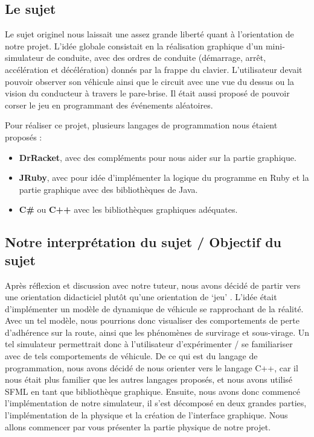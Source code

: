 \subsection{Le sujet}\label{subsec:le-sujet}
Le sujet originel nous laissait une assez grande liberté quant à l'orientation de notre projet.
L'idée globale consistait en la réalisation graphique d'un mini-simulateur de conduite, avec des ordres de conduite (démarrage, arrêt, accélération et décélération) donnés par la frappe du clavier.
L'utilisateur devait pouvoir observer son véhicule ainsi que le circuit avec une vue du dessus ou la vision du conducteur à travers le pare-brise.
Il était aussi proposé de pouvoir \og corser\fg{} le jeu en programmant des événements aléatoires.

Pour réaliser ce projet, plusieurs langages de programmation nous étaient proposés :
\begin{itemize}
    \item \textbf{DrRacket}, avec des compléments pour nous aider sur la partie graphique.
    \item \textbf{JRuby}, avec pour idée d'implémenter la logique du programme en Ruby et la partie graphique avec des bibliothèques de Java.
    \item \textbf{C\#} ou \textbf{C++} avec les bibliothèques graphiques adéquates.
\end{itemize}


\subsection{Notre interprétation du sujet / Objectif du sujet}\label{subsec:notre-interpretation-du-sujet-/-objectif-du-sujet}
Après réflexion et discussion avec notre tuteur, nous avons décidé de partir vers une orientation didacticiel plutôt qu'une \og orientation de `jeu' \fg{}.
L'idée était d'implémenter un modèle de dynamique de véhicule se rapprochant de la réalité.
Avec un tel modèle, nous pourrions donc visualiser des comportements de perte d'adhérence sur la route, ainsi que les phénomènes de survirage et sous-virage.
Un tel simulateur permettrait donc à l'utilisateur d'expérimenter / se familiariser avec de tels comportements de véhicule.
De ce qui est du langage de programmation, nous avons décidé de nous orienter vers le langage C++, car il nous était plus familier que les autres langages proposés, et nous avons utilisé SFML en tant que bibliothèque graphique.
Ensuite, nous avons donc commencé l'implémentation de notre simulateur, il s'est décomposé en deux grandes parties, l'implémentation de la physique et la création de l'interface graphique.
Nous allons commencer par vous présenter la partie physique de notre projet.

\newpage